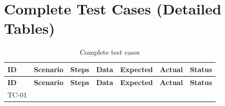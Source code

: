 \chapter{Complete Test Cases (Detailed Tables)}
\small\setlength{\tabcolsep}{3pt}
\begin{longtable}{|l|p{2.4cm}|p{3cm}|p{1.6cm}|p{2cm}|p{2cm}|p{1.3cm}|}
\caption{Complete test cases}\label{tab:fulltc}\\
\hline
\textbf{ID} & \textbf{Scenario} & \textbf{Steps} & \textbf{Data} & \textbf{Expected} & \textbf{Actual} & \textbf{Status}\\ \hline
\endfirsthead
\hline \textbf{ID} & \textbf{Scenario} & \textbf{Steps} & \textbf{Data} & \textbf{Expected} & \textbf{Actual} & \textbf{Status}\\ \hline
\endhead
TC-01 & \todo{...} & \todo{...} & \todo{...} & \todo{...} & \todo{...} & \todo{...}\\ \hline
\end{longtable}
